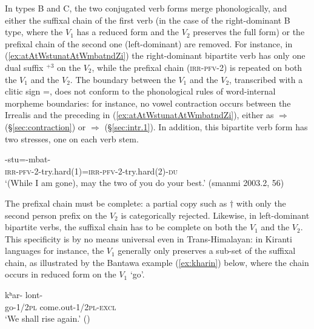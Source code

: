  In types B and C, the two conjugated verb forms merge phonologically, and either the suffixal chain of the first verb (in the case of the right-dominant B type, where the $V_1$ has a reduced form and the $V_2$ preserves the full form) or the prefixal chain of the second one (left-dominant) are removed.   For instance, in (\ref{ex:atAtWstunatAtWmbatndZi}) the right-dominant bipartite verb has only one dual suffix $^{+3}$ on the $V_2$, while the prefixal chain  (\textsc{irr}-\textsc{pfv}-2) is repeated on both the $V_1$ and the $V_2$. The boundary between the $V_1$ and the $V_2$, transcribed with a clitic sign =, does not conform to the phonological rules of word-internal morpheme boundaries: for instance, no vowel contraction occurs between the Irrealis  and the preceding  in (\ref{ex:atAtWstunatAtWmbatndZi}), either as  $\Rightarrow$  (§\ref{sec:contraction}) or  $\Rightarrow$   (§\ref{sec:intr.1}). In addition, this bipartite verb form has two stresses, one on each verb stem. 
  
\begin{exe}
\ex \label{ex:atAtWstunatAtWmbatndZi}
\gll {}-stu=-mbat-  \\
\textsc{irr}-\textsc{pfv}-\textsc{2}-try.hard(1)=\textsc{irr}-\textsc{pfv}-\textsc{2}-try.hard(2)-\textsc{du} \\
\glt `(While I am gone),  may the two of you do your best.' (smanmi 2003.2, 56)
\end{exe} 

The prefixal chain must be complete: a partial copy such as $\dagger$ with only the second person  prefix on the $V_2$ is categorically rejected. Likewise, in left-dominant bipartite verbs, the suffixal chain has to be complete on both the $V_1$ and the $V_2$. This specificity is by no means universal even in Trans-Himalayan: in Kiranti languages  for instance, the $V_1$ generally only preserves a sub-set of the suffixal chain, as illustrated by the Bantawa example (\ref{ex:kharin}) below, where the chain  occurs in reduced form  on the $V_1$  `go'.
 
 
 \begin{exe}
\ex  \label{ex:kharin}
\gll kʰar- lont-  \\
go-\textsc{1/2pl} come.out-\textsc{1/2pl-excl} \\
\glt `We shall rise again.' (\citealt[254]{doornenbal09})
\end{exe} 
 
